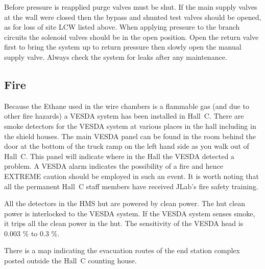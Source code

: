Before pressure is reapplied purge valves must be shut.  If the main
supply valves at the wall were closed then the bypass and shunted test
valves should be opened, as for loss of site LCW listed above.  When
applying pressure to the branch circuits the solenoid valves should be
in the open position.  Open the return valve first to bring the system
up to return pressure then slowly open the manual supply valve.  Always
check the system for leaks after any maintenance.


\subsection{Fire}

Because the Ethane used in the wire chambers is a flammable gas
(and due to other fire hazards) a VESDA
system has been installed in Hall~C. There are smoke detectors
for the VESDA system at various places in the hall including in the shield
houses.
The main VESDA panel can be found in the room behind the door at the bottom
of the truck ramp on the left hand side as you walk out of Hall~C. This
panel will indicate where in the Hall the VESDA detected a problem.
A VESDA alarm indicates the possibility of a fire and hence EXTREME caution
should be employed in such an event. It is worth noting that all the
permanent Hall~C staff members have received JLab's fire safety training.

All the detectors in the HMS hut are powered by clean power. The
hut clean power is interlocked to the VESDA system. If the VESDA system
senses smoke, it trips all the clean power in the hut. The sensitivity of the
VESDA head is 0.003 \% to 0.3 \%.

There is a map indicating the evacuation routes of the end station complex
posted outside the Hall~C counting house.

